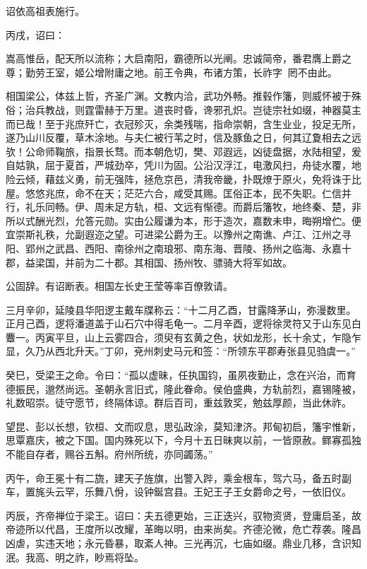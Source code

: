 \documentclass[12pt,UTF8]{ctexbook}
\begin{document}
诏依高祖表施行。

丙戌，诏曰：

嵩高惟岳，配天所以流称；大启南阳，霸德所以光阐。忠诚简帝，番君膺上爵之尊；勤劳王室，姬公增附庸之地。前王令典，布诸方策，长祚字，罔不由此。

相国梁公，体兹上哲，齐圣广渊。文教内洽，武功外畅。推毂作籓，则威怀被于殊俗；治兵教战，则霆雷赫于万里。道丧时昏，谗邪孔炽。岂徒宗社如缀，神器莫主而已哉！至于兆庶歼亡，衣冠殄灭，余类残喘，指命崇朝，含生业业，投足无所，遂乃山川反覆，草木涂地。与夫仁被行苇之时，信及豚鱼之日，何其辽夐相去之远欤！公命师鞠旅，指景长骛。而本朝危切，樊、邓遐远，凶徒盘据，水陆相望，爰自姑孰，屈于夏首，严城劲卒，凭川为固。公沿汉浮江，电激风扫，舟徒水覆，地险云倾，藉兹义勇，前无强阵，拯危京邑，清我帝畿，扑既燎于原火，免将诛于比屋。悠悠兆庶，命不在天；茫茫六合，咸受其赐。匡俗正本，民不失职。仁信并行，礼乐同畅。伊、周未足方轨，桓、文远有惭德。而爵后籓牧，地终秦、楚，非所以式酬光烈，允答元勋。实由公履谦为本，形于造次，嘉数未申，晦朔增伫。便宜崇斯礼秩，允副遐迩之望。可进梁公爵为王。以豫州之南谯、卢江、江州之寻阳、郢州之武昌、西阳、南徐州之南琅邪、南东海、晋陵、扬州之临海、永嘉十郡，益梁国，并前为二十郡。其相国、扬州牧、骠骑大将军如故。

公固辞。有诏断表。相国左长史王莹等率百僚敦请。

三月辛卯，延陵县华阳逻主戴车牒称云：“十二月乙酉，甘露降茅山，弥漫数里。正月己酉，逻将潘道盖于山石穴中得毛龟一。二月辛酉，逻将徐灵符又于山东见白麞一。丙寅平旦，山上云雾四合，须臾有玄黄之色，状如龙形，长十余丈，乍隐乍显，久乃从西北升天。”丁卯，兗州刺史马元和签：“所领东平郡寿张县见驺虞一。”

癸巳，受梁王之命。令曰：“孤以虚昧，任执国钧，虽夙夜勤止，念在兴治，而育德振民，邈然尚远。圣朝永言旧式，隆此眷命。侯伯盛典，方轨前烈，嘉锡隆被，礼数昭崇。徒守愿节，终隔体谅。群后百司，重兹敦奖，勉兹厚颜，当此休祚。

望昆、彭以长想，钦桓、文而叹息，思弘政涂，莫知津济。邦甸初启，籓宇惟新，思覃嘉庆，被之下国。国内殊死以下，今月十五日昧爽以前，一皆原赦。鳏寡孤独不能自存者，赐谷五斛。府州所统，亦同蠲荡。”

丙午，命王冕十有二旒，建天子旌旗，出警入跸，乘金根车，驾六马，备五时副车，置旄头云罕，乐舞八佾，设钟鋋宫县。王妃王子王女爵命之号，一依旧仪。

丙辰，齐帝禅位于梁王。诏曰：夫五德更始，三正迭兴，驭物资贤，登庸启圣，故帝迹所以代昌，王度所以改耀，革晦以明，由来尚矣。齐德沦微，危亡荐袭。隆昌凶虐，实违天地；永元昏暴，取紊人神。三光再沉，七庙如缀。鼎业几移，含识知泯。我高、明之祚，眇焉将坠。
\end{document}
